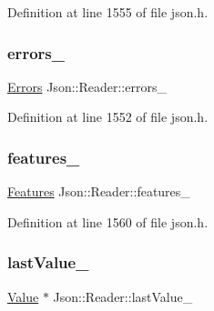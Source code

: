Definition at line 1555 of file json.\+h.

\hypertarget{class_json_1_1_reader_a1bbce45dc4df753bed60c129f4b5147c}{}\label{class_json_1_1_reader_a1bbce45dc4df753bed60c129f4b5147c} 
\subsubsection{\texorpdfstring{errors\+\_\+}{errors\_}}
{\footnotesize\ttfamily \hyperlink{class_json_1_1_reader_aae51e8f5bab3f067261c842a3ef858e5}{Errors} Json\+::\+Reader\+::errors\+\_\+\hspace{0.3cm}{\ttfamily [private]}}



Definition at line 1552 of file json.\+h.

\hypertarget{class_json_1_1_reader_aa9984ff8f519b5541346157b7aebf97b}{}\label{class_json_1_1_reader_aa9984ff8f519b5541346157b7aebf97b} 
\subsubsection{\texorpdfstring{features\+\_\+}{features\_}}
{\footnotesize\ttfamily \hyperlink{class_json_1_1_features}{Features} Json\+::\+Reader\+::features\+\_\+\hspace{0.3cm}{\ttfamily [private]}}



Definition at line 1560 of file json.\+h.

\hypertarget{class_json_1_1_reader_a320c91fa65cd76138ba445af6cbb6d29}{}\label{class_json_1_1_reader_a320c91fa65cd76138ba445af6cbb6d29} 
\subsubsection{\texorpdfstring{last\+Value\+\_\+}{lastValue\_}}
{\footnotesize\ttfamily \hyperlink{class_json_1_1_value}{Value} $\ast$ Json\+::\+Reader\+::last\+Value\+\_\+\hspace{0.3cm}{\ttfamily [private]}}



